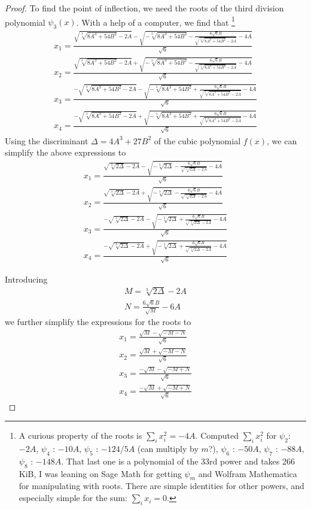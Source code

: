 \documentclass[12pt]{article}
\begin{document}
\begin{proof}
To find the point of inflection, we need the roots of the third division polynomial $\psi_3(x)$. With a help of a computer, we find that \footnote{
    A curious property of the roots is $\sum_i x_i^2 = -4A$.
    Computed $\sum_i x_i^2$ for $\psi_2$: $-2A$,  $\psi_4$ : $-10A$, $\psi_5$ : $-124/5A$ (can multiply by $m$?), $\psi_6$ : $-50A$, $\psi_7$ : $-88A$,
    $\psi_8$ : $-148A$. That last one is a polynomial of the 33rd power and takes 266 KiB, I was leaning on Sage Math for getting  $\psi_m$ and
    Wolfram Mathematica for manipulating with roots. There are simple identities for other powers, and especially simple for the sum: $\sum_i x_i = 0$.
}
\begin{align}
    x_1 = \frac{ \sqrt{\sqrt[3]{8 A^3+54 B^2}-2 A}-\sqrt{-\sqrt[3]{8 A^3+54 B^2}-\frac{6 \sqrt{6} B}{\sqrt{\sqrt[3]{8 A^3+54 B^2}-2 A}}-4 A}}{\sqrt{6}} \\
    x_2 = \frac{ \sqrt{\sqrt[3]{8 A^3+54 B^2}-2 A}+\sqrt{-\sqrt[3]{8 A^3+54 B^2}-\frac{6 \sqrt{6} B}{\sqrt{\sqrt[3]{8 A^3+54 B^2}-2 A}}-4 A}}{\sqrt{6}} \\
    x_3 = \frac{-\sqrt{\sqrt[3]{8 A^3+54 B^2}-2 A}-\sqrt{-\sqrt[3]{8 A^3+54 B^2}+\frac{6 \sqrt{6} B}{\sqrt{\sqrt[3]{8 A^3+54 B^2}-2 A}}-4 A}}{\sqrt{6}} \\
    x_4 = \frac{-\sqrt{\sqrt[3]{8 A^3+54 B^2}-2 A}+\sqrt{-\sqrt[3]{8 A^3+54 B^2}+\frac{6 \sqrt{6} B}{\sqrt{\sqrt[3]{8 A^3+54 B^2}-2 A}}-4 A}}{\sqrt{6}}
\end{align}
Using the discriminant $\Delta = 4A^3 + 27B^2$ of the cubic polynomial $f(x)$, we can simplify the above expressions to
\begin{align}
    x_1 = \frac{ \sqrt{\sqrt[3]{2 \Delta}-2 A}-\sqrt{-\sqrt[3]{2 \Delta}-\frac{6 \sqrt{6} B}{\sqrt{\sqrt[3]{2 \Delta}-2 A}}-4 A}}{\sqrt{6}} \\
    x_2 = \frac{ \sqrt{\sqrt[3]{2 \Delta}-2 A}+\sqrt{-\sqrt[3]{2 \Delta}-\frac{6 \sqrt{6} B}{\sqrt{\sqrt[3]{2 \Delta}-2 A}}-4 A}}{\sqrt{6}} \\
    x_3 = \frac{-\sqrt{\sqrt[3]{2 \Delta}-2 A}-\sqrt{-\sqrt[3]{2 \Delta}+\frac{6 \sqrt{6} B}{\sqrt{\sqrt[3]{2 \Delta}-2 A}}-4 A}}{\sqrt{6}} \\
    x_4 = \frac{-\sqrt{\sqrt[3]{2 \Delta}-2 A}+\sqrt{-\sqrt[3]{2 \Delta}+\frac{6 \sqrt{6} B}{\sqrt{\sqrt[3]{2 \Delta}-2 A}}-4 A}}{\sqrt{6}}
\end{align}

Introducing
\begin{align}
    M = \sqrt[3]{2 \Delta} - 2A \\
    N = \frac{6 \sqrt{6} B}{\sqrt{M}} - 6A
\end{align}
we further simplify the expressions for the roots to
\begin{align}
    x_1 = \frac{ \sqrt{M}-\sqrt{-M-N}}{\sqrt{6}} \\
    x_2 = \frac{ \sqrt{M}+\sqrt{-M-N}}{\sqrt{6}} \\
    x_3 = \frac{-\sqrt{M}-\sqrt{-M+N}}{\sqrt{6}} \\
    x_4 = \frac{-\sqrt{M}+\sqrt{-M+N}}{\sqrt{6}}
\end{align}


\end{proof}
\end{document}
